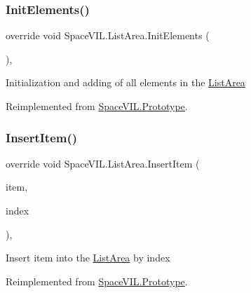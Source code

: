 \subsubsection{\texorpdfstring{Init\+Elements()}{InitElements()}}
{\footnotesize\ttfamily override void Space\+V\+I\+L.\+List\+Area.\+Init\+Elements (\begin{DoxyParamCaption}{ }\end{DoxyParamCaption})\hspace{0.3cm}{\ttfamily [inline]}, {\ttfamily [virtual]}}



Initialization and adding of all elements in the \mbox{\hyperlink{class_space_v_i_l_1_1_list_area}{List\+Area}} 



Reimplemented from \mbox{\hyperlink{class_space_v_i_l_1_1_prototype_ac3379fe02923ee155b5b0084abf27420}{Space\+V\+I\+L.\+Prototype}}.

\mbox{\label{class_space_v_i_l_1_1_list_area_a44efda800a4a280b7a452bd09c90f484}} 
\subsubsection{\texorpdfstring{Insert\+Item()}{InsertItem()}}
{\footnotesize\ttfamily override void Space\+V\+I\+L.\+List\+Area.\+Insert\+Item (\begin{DoxyParamCaption}\item[{\mbox{\hyperlink{interface_space_v_i_l_1_1_core_1_1_i_base_item}{I\+Base\+Item}}}]{item,  }\item[{Int32}]{index }\end{DoxyParamCaption})\hspace{0.3cm}{\ttfamily [inline]}, {\ttfamily [virtual]}}



Insert item into the \mbox{\hyperlink{class_space_v_i_l_1_1_list_area}{List\+Area}} by index 



Reimplemented from \mbox{\hyperlink{class_space_v_i_l_1_1_prototype_a9dd004dfa4ca2ea37c21770a24434270}{Space\+V\+I\+L.\+Prototype}}.

\mbox{\label{class_space_v_i_l_1_1_list_area_a0020756686088a62a43388973fa2d7bf}} 
